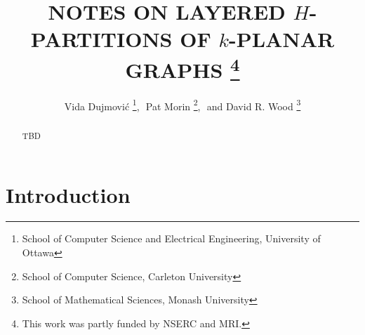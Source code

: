 \documentclass{patmorin}
\title{\MakeUppercase{Notes on Layered $H$-Partitions of $k$-Planar Graphs}%
    \thanks{This work was partly funded by NSERC and MRI.}}
\author{Vida Dujmovi\'c%
        \thanks{School of Computer Science and Electrical Engineering, 
                University of Ottawa},\,\, 
        Pat Morin%
        \thanks{School of Computer Science, Carleton University},\,\, and
        David R. Wood%
        \thanks{School of Mathematical Sciences, Monash University}}
\begin{document}
\maketitle


\begin{abstract}
  TBD
\end{abstract}

\section{Introduction}
\end{document}
